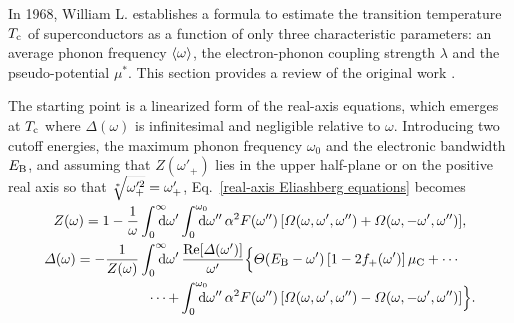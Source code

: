 In 1968, William L.  establishes a formula to estimate the
transition temperature $T \sb{\text{c}}$ of superconductors as a function of only three
characteristic parameters: an average phonon frequency $\langle\omega\rangle$, the
electron-phonon coupling strength $\lambda$ and the 
pseudo-potential $\mu^*$. This section provides a review of the original work
\cite{McMillan68}.

The starting point is a linearized form of the real-axis 
equations, which emerges at $T \sb{\text{c}}$ where $\Delta(\omega)$ is infinitesimal
and negligible relative to $\omega$. Introducing two cutoff energies, the
maximum phonon frequency $\omega_0$ and the electronic bandwidth $E \sb{\text{B}}$, and
assuming that $Z(\omega'_+)$ lies in the upper half-plane or on the positive
real axis so that $\smash{\sqrt[\ast]{\omega'^2_+}} = \omega'_+$,
Eq.~\ref{real-axis Eliashberg equations} becomes
%
\begin{subequations} \label{linearized real-axis equations}
    \begin{align}
        Z(\omega) = 1 - \frac 1 \omega
        \int \from 0 \till \infty \D \omega'
        &\int \from 0 \till{\omega_0} \D \omega'' \, \alpha^2 F(\omega'') \,
        [ \Omega(\omega,  \omega', \omega'')
        + \Omega(\omega, -\omega', \omega'') ],
        \\
        \Delta(\omega) = -\frac 1 {Z(\omega)}
        \int \from 0 \till \infty \D \omega' \,
        \!&\,\frac{\Re[\Delta(\omega')]}{\omega'}
        \Big \{
            \Theta(E \sub B - \omega') \, [1 - 2 f_+(\omega')] \, \mu \sub C
            + \cdots
            \\
            \cdots +
            &\int \from 0 \till{\omega_0} \D \omega'' \, \alpha^2 F(\omega'') \,
            [ \Omega(\omega,  \omega', \omega'')
            - \Omega(\omega, -\omega', \omega'') ]
        \Big \}.
    \end{align}
\end{subequations}

